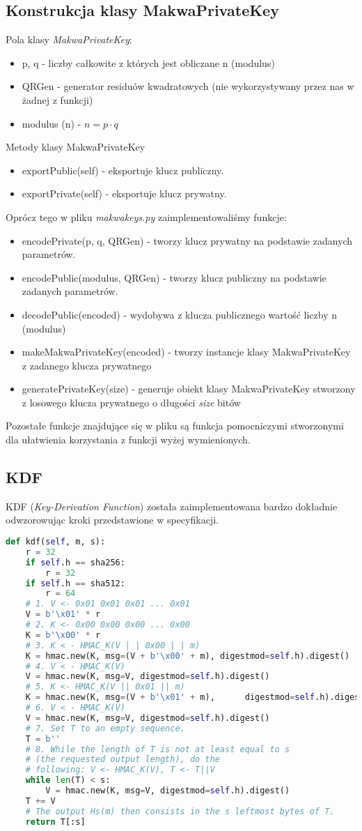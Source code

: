 \documentclass[a4paper,titleauthor]{mwart}
\begin{document}
\subsection{Konstrukcja klasy MakwaPrivateKey}
Pola klasy \textit{MakwaPrivateKey}:
\begin{itemize}
	\item p, q - liczby całkowite z których jest obliczane n (modulus)
	\item QRGen - generator residuów kwadratowych (nie wykorzystywany przez nas w żadnej z funkcji)
	\item modulus (n) - $n=p\cdot q$
\end{itemize}
Metody klasy MakwaPrivateKey
\begin{itemize}
	\item exportPublic(self) - eksportuje klucz publiczny.
	\item exportPrivate(self) - eksportuje klucz prywatny.
\end{itemize}
Oprócz tego w pliku \textit{makwakeys.py} zaimplementowaliśmy funkcje:
\begin{itemize}
	\item encodePrivate(p, q, QRGen) - tworzy klucz prywatny na podstawie zadanych parametrów.
	\item encodePublic(modulus, QRGen) - tworzy klucz publiczny na podstawie zadanych parametrów.
	\item decodePublic(encoded) - wydobywa z klucza publicznego wartość liczby n (modulus)
	\item makeMakwaPrivateKey(encoded) - tworzy instancje klasy MakwaPrivateKey z zadanego klucza prywatnego
	\item generatePrivateKey(size) - generuje obiekt klasy MakwaPrivateKey stworzony z losowego klucza prywatnego o długości \textit{size} bitów
\end{itemize}
Pozostałe funkcje znajdujące się w pliku są funkcja pomocniczymi stworzonymi dla ułatwienia korzystania z funkcji wyżej wymienionych.
\subsection{KDF}
KDF (\textit{Key-Derivation Function}) została zaimplementowana bardzo dokładnie odwzorowując kroki przedstawione w specyfikacji.
\begin{lstlisting}[language=Python]
def kdf(self, m, s):
	r = 32
	if self.h == sha256:
		r = 32
	if self.h == sha512:
		r = 64
	# 1. V <- 0x01 0x01 0x01 ... 0x01
	V = b'\x01' * r
	# 2. K <- 0x00 0x00 0x00 ... 0x00
	K = b'\x00' * r
	# 3. K < - HMAC_K(V | | 0x00 | | m)
	K = hmac.new(K, msg=(V + b'\x00' + m), digestmod=self.h).digest()
	# 4. V < - HMAC_K(V)
	V = hmac.new(K, msg=V, digestmod=self.h).digest()
	# 5. K <- HMAC_K(V || 0x01 || m)
	K = hmac.new(K, msg=(V + b'\x01' + m), 		digestmod=self.h).digest()
	# 6. V < - HMAC_K(V)
	V = hmac.new(K, msg=V, digestmod=self.h).digest()
	# 7. Set T to an empty sequence.
	T = b''
	# 8. While the length of T is not at least equal to s
	# (the requested output length), do the
	# following: V <- HMAC_K(V), T <- T||V
	while len(T) < s:
		V = hmac.new(K, msg=V, digestmod=self.h).digest()
	T += V
	# The output Hs(m) then consists in the s leftmost bytes of T.
	return T[:s]
\end{lstlisting}
\end{document}
